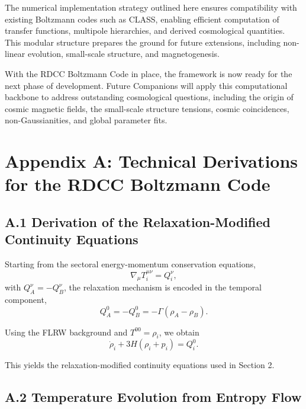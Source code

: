 \documentclass[11pt,a4paper]{article}
\begin{document}
The numerical implementation strategy outlined here ensures compatibility with existing Boltzmann
codes such as CLASS, enabling efficient computation of transfer functions, multipole hierarchies,
and derived cosmological quantities. This modular structure prepares the ground for future extensions,
including non-linear evolution, small-scale structure, and magnetogenesis.

With the RDCC Boltzmann Code in place, the framework is now ready for the next phase of development.
Future Companions will apply this computational backbone to address outstanding cosmological questions,
including the origin of cosmic magnetic fields, the small-scale structure tensions, cosmic coincidences,
non-Gaussianities, and global parameter fits.

\appendix
\section*{Appendix A: Technical Derivations for the RDCC Boltzmann Code}

\subsection*{A.1 Derivation of the Relaxation-Modified Continuity Equations}

Starting from the sectoral energy-momentum conservation equations,
\begin{equation}
\nabla_\mu T^{\mu\nu}_i = Q^\nu_i,
\end{equation}
with $Q^\nu_A = -Q^\nu_B$, the relaxation mechanism is encoded in the temporal component,
\begin{equation}
Q^0_A = -Q^0_B = -\Gamma(\rho_A - \rho_B).
\end{equation}

Using the FLRW background and $T^{00} = \rho_i$, we obtain
\begin{equation}
\dot{\rho}_i + 3H(\rho_i + p_i) = Q^0_i.
\end{equation}

This yields the relaxation-modified continuity equations used in Section 2.

\subsection*{A.2 Temperature Evolution from Entropy Flow}
\end{document}
